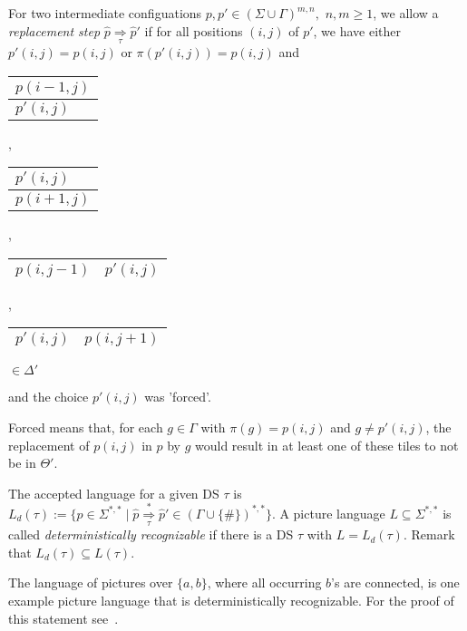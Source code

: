 \begin{definition}
For two intermediate configuations $p, p' \in (\Sigma \cup \Gamma)^{m, n},$ $n, m \geq 1$, we allow
a \emph{replacement step} $\hat{p} \underset{\tau}{\Rightarrow} \hat{p}'$ if for all positions
$(i,j)$ of $p'$, we have either $p'(i, j) = p(i, j)$ or $\pi(p'(i, j)) = p(i, j)$
and
\begin{center}
\begin{tabular}{|C{2.2cm}|} 
\hline
 $p(i - 1, j)$ \tabularnewline
\hline
 $p'(i, j)$  \tabularnewline
\hline
\end{tabular}, \begin{tabular}{|C{2.2cm}|} 
\hline
 $p'(i, j)$  \tabularnewline
\hline
 $p(i + 1, j)$ \tabularnewline
\hline
\end{tabular}, \begin{tabular}{|C{2.2cm}|C{2.2cm}|} 
\hline 
 $p(i, j - 1)$ & \hspace{0.3cm}$p'(i, j)$\hspace{0.3cm} \tabularnewline
\hline 
\end{tabular}, \begin{tabular}{|C{2.2cm}|C{2.2cm}|} 
\hline  
 \hspace{0.3cm}$p'(i, j)$\hspace{0.3cm} & $p(i, j + 1)$  \tabularnewline
\hline 
\end{tabular} 
$\in \Delta'$
\end{center} 
and the choice $p'(i,j)$ was 'forced'. 

Forced means that, for each $g\in\Gamma$ with $\pi(g) =
p(i,j)$ and $g \neq p'(i,j)$, the replacement of $p(i, j)$ in $p$ by $g$ would result in at least
one of these tiles to not be in $\Theta'$.
\label{deterministic_process_definition}
\end{definition}
The accepted language for a given DS $\tau$ is $L_d(\tau) := \{p \in \Sigma^{*,*} \mid
\hat{p} \overset{*}{\underset{\tau}{\Rightarrow}} \hat{p}' \in (\Gamma \cup
\{\#\})^{*,*}\}$. A picture language $L \subseteq \Sigma^{*,*}$ is called
\emph{deterministically recognizable} if there is a DS $\tau$ with $L = L_d(\tau)$.
Remark that $L_d(\tau) \subseteq L(\tau)$.

The language of pictures over $\{a, b\}$, where all occurring $b$'s
are connected, is one example picture language that is deterministically
recognizable. For the proof of this statement see~\cite{reinhardt1998recognizable}.
\label{deterministicprocess}